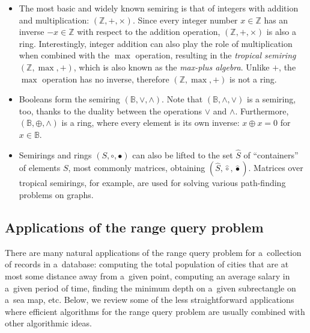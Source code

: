 \documentclass{toc}
\begin{document}
\begin{itemize}
    \item The most basic and widely known semiring is that of integers with
    addition and multiplication: $(\mathbb{Z}, +, \times)$. Since every integer
    number $x\in \mathbb{Z}$ has an inverse $-x \in \mathbb{Z}$ with respect to
    the addition operation, $(\mathbb{Z}, +, \times)$ is also a ring.
    Interestingly, integer addition can also play the role of multiplication when
    combined with the $\max$ operation, resulting in the \emph{tropical semiring}
    $(\mathbb{Z}, \max, +)$, which is also known as the \emph{max-plus algebra}.
    Unlike $+$, the $\max$ operation has no inverse, therefore
    $(\mathbb{Z}, \max, +)$ is not a ring.

    \item Booleans form the semiring $(\mathbb{B}, \vee, \wedge)$. Note that
$(\mathbb{B}, \wedge, \vee)$ is a semiring, too, %
    thanks to the duality between
    the operations $\vee$ and $\wedge$. Furthermore,
    $(\mathbb{B}, \oplus, \wedge)$ is a ring, where every element is its own
    inverse: $x \oplus x = 0$ for $x \in \mathbb{B}$.

    \item Semirings and rings $(S, \circ, \bullet)$ can also be lifted to the set
    $\hat{S}$ of ``containers'' of elements $S$, most commonly matrices, obtaining
    $(\hat{S}, \hat{\circ}, \hat{\bullet})$. Matrices over tropical semirings, for
    example, are used for solving various path-finding problems on graphs.
\end{itemize}

\subsection{Applications of the range query problem}\label{subseq:rmqapp}
There are many natural applications of the
range query
problem for a~collection of records in a~database: computing the total population of cities that are at most some distance away from a~given point, computing an average salary in a~given period of time, finding the minimum depth on a~given subrectangle on a~sea map, etc. Below, we review some of the less straightforward applications where efficient algorithms for the
range query
problem are usually combined with other algorithmic ideas.
\end{document}
